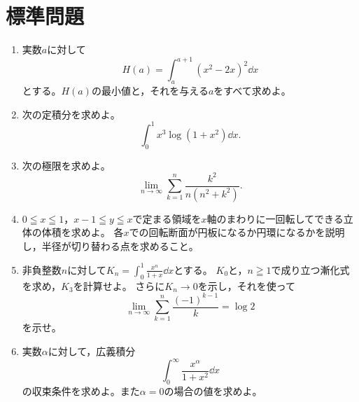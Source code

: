 \section{標準問題}\label{節:総合標準}

\begin{enumerate}[label=\textbf{\thechapter.\arabic*},leftmargin=*,start=7]
 \item\label{問:総合七区間の最適化}
 実数$a$に対して
 \[
  H(a)=\int_a^{a+1}(x^2-2x)^2\dd x
 \]
 とする。$H(a)$の最小値と，それを与える$a$をすべて求めよ。
 \item\label{問:総合八置換と部分積分}
 次の定積分を求めよ。
 \[
  \int_0^1x^3\log(1+x^2)\dd x.
 \]
 \item\label{問:総合九区分求積}
 次の極限を求めよ。
 \[
  \lim_{n\to\infty}\sum_{k=1}^{n}\frac{k^2}{n(n^2+k^2)}.
 \]
 \item\label{問:総合十軸を横切る回転}
 $0\leqq x\leqq1$，$x-1\leqq y\leqq x$で定まる領域を$x$軸のまわりに一回転してできる立体の体積を求めよ。
 各$x$での回転断面が円板になるか円環になるかを説明し，半径が切り替わる点を求めること。
 \item\label{問:総合十一漸化式}
 非負整数$n$に対して$K_n=\int_0^1\frac{x^n}{1+x}\dd x$とする。
 $K_0$と，$n\geqq1$で成り立つ漸化式を求め，$K_3$を計算せよ。
 さらに$K_n\to0$を示し，それを使って
 \[
  \lim_{n\to\infty}\sum_{k=1}^{n}\frac{(-1)^{k-1}}{k}=\log2
 \]
 を示せ。
 \item\label{問:総合十二両端判定}
 実数$\alpha$に対して，広義積分
 \[
  \int_0^{\infty}\frac{x^\alpha}{1+x^2}\dd x
 \]
 の収束条件を求めよ。また$\alpha=0$の場合の値を求めよ。
\end{enumerate}

